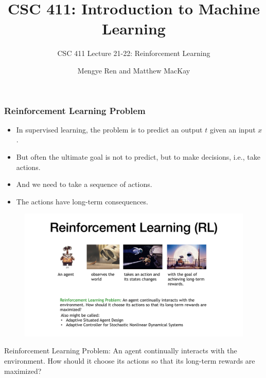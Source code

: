\documentclass[handout]{beamer}
\title[CSC411 2019 Winter Lecture 21-22]{CSC 411: Introduction to Machine Learning}
\subtitle{CSC 411 Lecture 21-22: Reinforcement Learning}
\author[UofT]{Mengye Ren and Matthew MacKay}
\institute[]{University of Toronto}
\date{}
\begin{document}
\begin{frame}
  \titlepage
\end{frame}












\begin{frame}\frametitle{Reinforcement Learning Problem}\small
\begin{itemize}
	\item In supervised learning, the problem is to predict an output $t$ given an input $x$.
	\item But often the ultimate goal is not to predict, but to make decisions, i.e., take actions.
	\item And we need to take a sequence of actions.
	\item The actions have long-term consequences.
\end{itemize}

\begin{figure}
	\includegraphics[width=0.75\linewidth]{Figures/RL_Problem}
\end{figure}

Reinforcement Learning Problem: An agent continually interacts with the environment. How should it choose its actions so that its long-term rewards are maximized?	
\end{frame}
\end{document}
